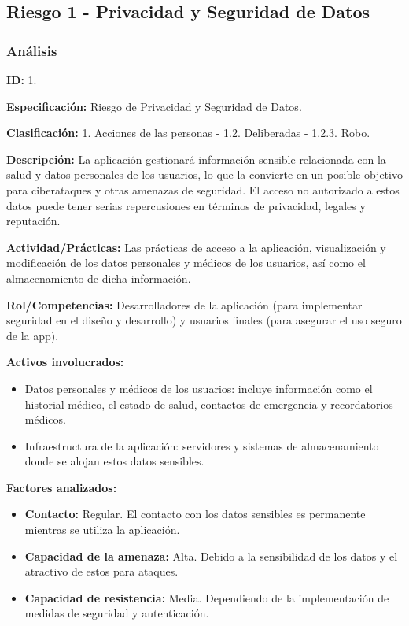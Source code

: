 \documentclass[a4paper,12pt]{article}
\begin{document}
    \subsection{Riesgo 1 - Privacidad y Seguridad de Datos}
    \subsubsection{Análisis}
    \par \textbf{ID:} 1.
    \par \textbf{Especificación:} Riesgo de Privacidad y Seguridad de Datos.
    \par \textbf{Clasificación:} 1. Acciones de las personas - 1.2. Deliberadas - 1.2.3. Robo.
    \par \textbf{Descripción:} La aplicación gestionará información sensible relacionada con la salud y datos personales de los usuarios, lo que la convierte en un posible objetivo para ciberataques y otras amenazas de seguridad. El acceso no autorizado a estos datos puede tener serias repercusiones en términos de privacidad, legales y reputación.
    \par \textbf{Actividad/Prácticas:} Las prácticas de acceso a la aplicación, visualización y modificación de los datos personales y médicos de los usuarios, así como el almacenamiento de dicha información.
    \par \textbf{Rol/Competencias:} Desarrolladores de la aplicación (para implementar seguridad en el diseño y desarrollo) y usuarios finales (para asegurar el uso seguro de la app).
    \par \textbf{Activos involucrados:}
    \begin{itemize}
        \item Datos personales y médicos de los usuarios: incluye información como el historial médico, el estado de salud, contactos de emergencia y recordatorios médicos.
        \item Infraestructura de la aplicación: servidores y sistemas de almacenamiento donde se alojan estos datos sensibles.
    \end{itemize}
    \par \textbf{Factores analizados:}
    \begin{itemize}
        \item \textbf{Contacto:} Regular. El contacto con los datos sensibles es permanente mientras se utiliza la aplicación.
        \item \textbf{Capacidad de la amenaza:} Alta. Debido a la sensibilidad de los datos y el atractivo de estos para ataques.
        \item \textbf{Capacidad de resistencia:} Media. Dependiendo de la implementación de medidas de seguridad y autenticación.
    \end{itemize}
\end{document}
